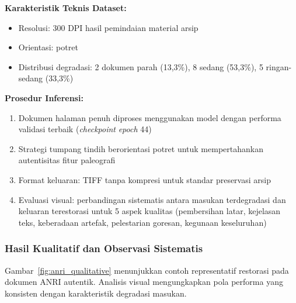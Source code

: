 \documentclass[12pt,a4paper]{article}
\begin{document}
\textbf{Karakteristik Teknis Dataset:}
\begin{itemize}[nosep]
    \item Resolusi: 300 DPI hasil pemindaian material arsip
    \item Orientasi: potret
    \item Distribusi degradasi: 2 dokumen parah (13,3\%), 8 sedang (53,3\%), 5 ringan-sedang (33,3\%)
\end{itemize}

\textbf{Prosedur Inferensi:}
\begin{enumerate}[nosep]
    \item Dokumen halaman penuh diproses menggunakan model dengan performa validasi terbaik (\textit{checkpoint} \textit{epoch} 44)
    \item Strategi tumpang tindih berorientasi potret untuk mempertahankan autentisitas fitur paleografi
    \item Format keluaran: TIFF tanpa kompresi untuk standar preservasi arsip
    \item Evaluasi visual: perbandingan sistematis antara masukan terdegradasi dan keluaran terestorasi untuk 5 aspek kualitas (pembersihan latar, kejelasan teks, keberadaan artefak, pelestarian goresan, kegunaan keseluruhan)
\end{enumerate}

\vspace{0.8em}

\subsubsection{Hasil Kualitatif dan Observasi Sistematis}
\label{subsubsec:anri-hasil-observasi}

Gambar~\ref{fig:anri_qualitative} menunjukkan contoh representatif restorasi pada dokumen ANRI autentik. Analisis visual mengungkapkan pola performa yang konsisten dengan karakteristik degradasi masukan.
\end{document}

